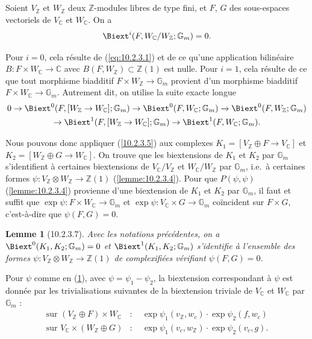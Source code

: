 \documentclass[12pt,a4paper]{amsart}
\theoremstyle{plain}
\newtheorem{lemme}{Lemme}[section]
\theoremstyle{definition}
\theoremstyle{remark}
\numberwithin{equation}{section}
\begin{document}
\subsection{}\label{10.2.3.6}
Soient $V_\mathbb{Z}$ et $W_\mathbb{Z}$ deux $\mathbb{Z}$-modules libres de type fini, et $F$, $G$ des sous-espaces vectoriels de $V_\mathbb{C}$ et $W_\mathbb{C}$. On a
\[
\Biext^i(F,W_\mathbb{C}/W_\mathbb{Z};\mathbb{G}_m)=0.
\]

Pour $i=0$, cela résulte de (\ref{eq:10.2.3.1}) et de ce qu'une application bilinéaire $B:F\times W_\mathbb{C}\to\mathbb{C}$ avec $B(F,W_\mathbb{Z})\subset\mathbb{Z}(1)$ est nulle. Pour $i=1$, cela résulte de ce que tout morphisme biadditif $F\times W_\mathbb{Z}\to\mathbb{G}_m$ provient d'un morphisme biadditif $F\times W_\mathbb{C}\to\mathbb{G}_m$. Autrement dit, on utilise la suite exacte longue
\begin{multline*}
0 \to \Biext^0(F,[W_\mathbb{Z}\to W_\mathbb{C}];\mathbb{G}_m) \to \Biext^0(F,W_\mathbb{C};\mathbb{G}_m) \xrightarrow{} \Biext^0(F,W_\mathbb{Z};\mathbb{G}_m) \\
\to \Biext^1(F,[W_\mathbb{Z}\to W_\mathbb{C}];\mathbb{G}_m) \to \Biext^1(F,W_\mathbb{C};\mathbb{G}_m).
\end{multline*}

Nous pouvons donc appliquer (\ref{10.2.3.5}) aux complexes $K_1=[V_\mathbb{Z}\oplus F\to V_\mathbb{C}]$ et $K_2=[W_\mathbb{Z}\oplus G\to W_\mathbb{C}]$. On trouve que les biextensions de $K_1$ et $K_2$ par $\mathbb{G}_m$ s'identifient à certaines biextensions de $V_\mathbb{C}/V_\mathbb{Z}$ et $W_\mathbb{C}/W_\mathbb{Z}$ par $\mathbb{G}_m$, i.e.~à certaines formes $\psi:V_\mathbb{Z}\otimes W_\mathbb{Z}\to\mathbb{Z}(1)$ (\ref{lemme:10.2.3.4}). Pour que $P(\psi,\psi)$ (\ref{lemme:10.2.3.4}) provienne d'une biextension de $K_1$ et $K_2$ par $\mathbb{G}_m$, il faut et suffit que $\exp\psi:F\times W_\mathbb{C}\to\mathbb{G}_m$ et $\exp\psi:V_\mathbb{C}\times G\to\mathbb{G}_m$ coïncident sur $F\times G$, c'est-à-dire que $\psi(F,G)=0$.

\begin{lemme}[10.2.3.7]\label{lemme:10.2.3.7}
Avec les notations précédentes, on a $\Biext^0(K_1,K_2;\mathbb{G}_m)=0$ et $\Biext^1(K_1,K_2;\mathbb{G}_m)$ s'identifie à l'ensemble des formes $\psi:V_\mathbb{Z}\otimes W_\mathbb{Z}\to\mathbb{Z}(1)$ de complexifiées vérifiant $\psi(F,G)=0$.
\end{lemme}

Pour $\psi$ comme en (\ref{lemme:10.2.3.7}), avec $\psi=\psi_1-\psi_2$, la biextension correspondant à $\psi$ est donnée par les trivialisations suivantes de la biextension triviale de $V_\mathbb{C}$ et $W_\mathbb{C}$ par $\mathbb{G}_m$ :
\begin{align*}
\text{sur }(V_\mathbb{Z}\oplus F)\times W_\mathbb{C}&:\quad \exp\psi_1(v_\mathbb{Z},w_c)\cdot\exp\psi_2(f,w_c) \\
\text{sur }V_\mathbb{C}\times(W_\mathbb{Z}\oplus G)&:\quad \exp\psi_1(v_c,w_\mathbb{Z})\cdot\exp\psi_2(v_c,g).
\end{align*}
\end{document}
